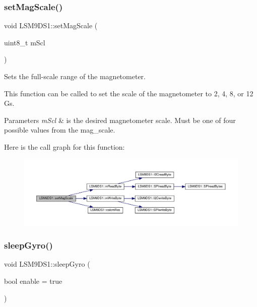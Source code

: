 \subsubsection{\texorpdfstring{set\+Mag\+Scale()}{setMagScale()}}
{\footnotesize\ttfamily void L\+S\+M9\+D\+S1\+::set\+Mag\+Scale (\begin{DoxyParamCaption}\item[{uint8\+\_\+t}]{m\+Scl }\end{DoxyParamCaption})}



Sets the full-\/scale range of the magnetometer. 

This function can be called to set the scale of the magnetometer to 2, 4, 8, or 12 Gs.


\begin{DoxyParams}{Parameters}
{\em m\+Scl} & is the desired magnetometer scale. Must be one of four possible values from the mag\+\_\+scale. \\
\hline
\end{DoxyParams}
Here is the call graph for this function\+:\nopagebreak
\begin{figure}[H]
\begin{center}
\leavevmode
\includegraphics[width=350pt]{classLSM9DS1_ad7604159a07b0d088cdfb6ba4a0093b0_cgraph}
\end{center}
\end{figure}
\mbox{\label{classLSM9DS1_a13b61812069b399547f177b0b0af8fe3}} 
\subsubsection{\texorpdfstring{sleep\+Gyro()}{sleepGyro()}}
{\footnotesize\ttfamily void L\+S\+M9\+D\+S1\+::sleep\+Gyro (\begin{DoxyParamCaption}\item[{bool}]{enable = {\ttfamily true} }\end{DoxyParamCaption})}



